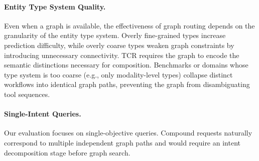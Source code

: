 \paragraph{Entity Type System Quality.}

Even when a graph is available, the effectiveness of graph routing depends on the granularity of the entity type system.
Overly fine-grained types increase prediction difficulty, while overly coarse types weaken graph constraints by introducing unnecessary connectivity.
TCR requires the graph to encode the semantic distinctions necessary for composition.
Benchmarks or domains whose type system is too coarse (e.g., only modality-level types) collapse distinct workflows into identical graph paths, preventing the graph from disambiguating tool sequences.

\paragraph{Single-Intent Queries.}

Our evaluation focuses on single-objective queries.
Compound requests naturally correspond to multiple independent graph paths and would require an intent decomposition stage before graph search.
